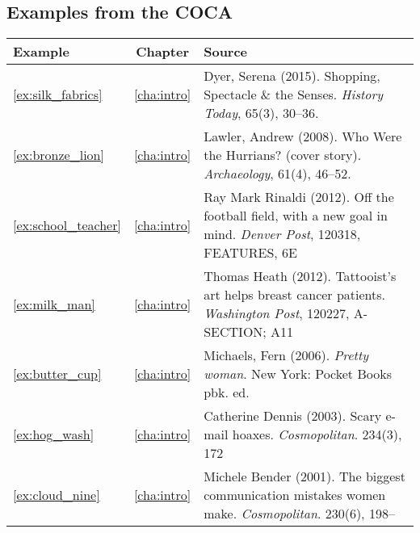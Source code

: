 \subsection{Examples from the COCA}



\begin{longtable}{lcp{8.5cm}}\lsptoprule
Example&Chapter&Source\\\midrule
\ref{ex:silk_fabrics}&\ref{cha:intro}&Dyer, Serena (2015). Shopping, Spectacle \& the Senses. \emph{History Today}, 65(3), 30--36.\\
\ref{ex:bronze_lion}&\ref{cha:intro}&Lawler, Andrew (2008). Who Were the Hurrians? (cover story). \emph{Archaeology}, 61(4), 46--52.\\
\ref{ex:school_teacher}&\ref{cha:intro}&Ray Mark Rinaldi (2012). Off the football field, with a new goal in mind. \emph{Denver Post}, 120318, FEATURES, 6E\\
\ref{ex:milk_man}&\ref{cha:intro}&Thomas Heath (2012). Tattooist's art helps breast cancer patients. \emph{Washington Post}, 120227, A-SECTION; A11\\
\ref{ex:butter_cup}&\ref{cha:intro}&Michaels, Fern (2006). \emph{Pretty woman}. New York: Pocket Books pbk. ed.\\
\ref{ex:hog_wash}&\ref{cha:intro}&Catherine Dennis (2003). Scary e-mail hoaxes. \emph{Cosmopolitan}. 234(3), 172\\
\ref{ex:cloud_nine}&\ref{cha:intro}&Michele Bender (2001). The biggest communication mistakes women make. \emph{Cosmopolitan}. 230(6), 198--\\

\end{longtable}
